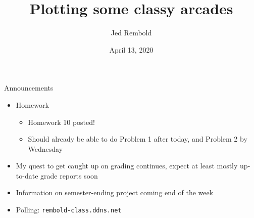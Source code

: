 \documentclass[pdf, aspectratio=169, 12pt]{beamer}
\title{Plotting some classy arcades}
\author{Jed Rembold}
\date{April 13, 2020}
\begin{document}
\begin{frame}{Announcements}
	\begin{itemize}
		\item Homework
			\begin{itemize}
				\item Homework 10 posted!
				\item Should already be able to do Problem 1 after today, and Problem 2 by Wednesday
			\end{itemize}
		\item My quest to get caught up on grading continues, expect at least mostly up-to-date grade reports soon
		\item Information on semester-ending project coming end of the week
		\item Polling: \nolinkurl{rembold-class.ddns.net}
	\end{itemize}
\end{frame}
\end{document}
